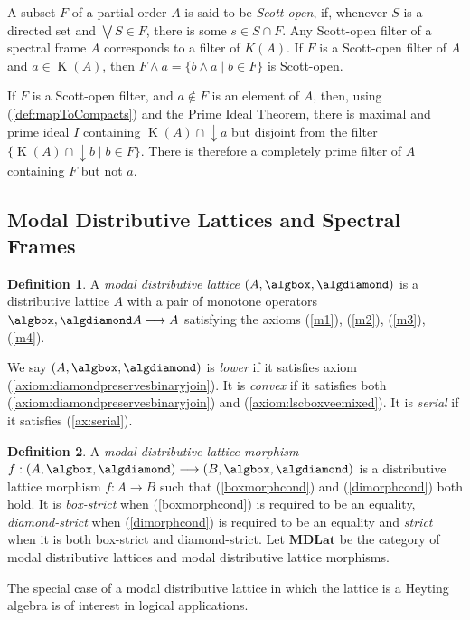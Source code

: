 \documentclass{article}[a4paper]
\theoremstyle{definition}
\newtheorem{definition}{Definition}%
\newcommand{\mdlat}{\mathbf{MDLat}}
\DeclareMathOperator{\downset}{\downarrow}
\DeclareMathOperator{\compacts}{K}
\begin{document}
A subset $F$ of a partial order $A$ is said to be \emph{Scott-open}, if, whenever $S$ is a directed set and $\bigvee S \in F$, there is some $s \in S\cap F$.
Any Scott-open filter of a spectral frame $A$ corresponds to a filter of $K(A)$. 
If $F$ is a Scott-open filter of $A$ and $a \in \compacts(A)$, then 
$F \wedge a = \{ b\wedge a \mid b \in F \}$ is Scott-open.

If $F$ is a Scott-open filter, and $a\notin F$ is an element of $A$, then, using (\ref{def:mapToCompacts}) and the Prime Ideal Theorem, there is maximal and prime ideal $I$ containing $\compacts(A) \cap \downset a$ but disjoint from the filter $\{ \compacts (A) \cap \downset b \mid b \in F \}$.
There is therefore a completely prime filter of $A$ containing $F$ but not $a$.


\subsection{Modal Distributive Lattices and Spectral Frames}

\begin{definition}
    A \emph{modal distributive lattice} $(A,\algbox, \algdiamond)$ is a distributive lattice $A$ with a pair of monotone operators $\algbox, \algdiamond A  \longrightarrow A$ satisfying the axioms (\ref{m1}), (\ref{m2}), (\ref{m3}), (\ref{m4}).  
\end{definition}
We say $(A,\algbox, \algdiamond)$ is \emph{lower} if it satisfies axiom (\ref{axiom:diamondpreservesbinaryjoin}). It is \emph{convex} if it satisfies both (\ref{axiom:diamondpreservesbinaryjoin}) and (\ref{axiom:lscboxveemixed}).
It is \emph{serial} if it satisfies (\ref{ax:serial}).

\begin{definition}
A \emph{modal distributive lattice morphism} 
$f:(A, \algbox, \algdiamond) \longrightarrow (B, \algbox, \algdiamond)$ is a distributive lattice morphism $f:A \longrightarrow B$ such that (\ref{boxmorphcond}) and (\ref{dimorphcond}) both hold. It is \emph{box-strict} when (\ref{boxmorphcond}) is required to be an equality, \emph{diamond-strict} when (\ref{dimorphcond}) is required to be an equality and \emph{strict} when it is both box-strict and diamond-strict. 
Let $\mdlat$ be the category of modal distributive lattices and modal distributive lattice morphisms.
\end{definition}
The special case of a modal distributive lattice in which the lattice is a Heyting algebra is of interest in logical applications.
\end{document}
